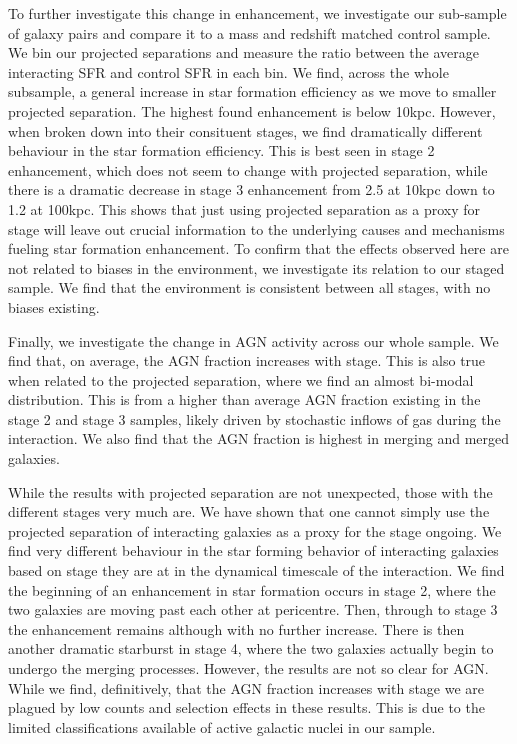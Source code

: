 To further investigate this change in enhancement, we investigate our sub-sample of galaxy pairs and compare it to a mass and redshift matched control sample. We bin our projected separations and measure the ratio between the average interacting SFR and control SFR in each bin. We find, across the whole subsample, a general increase in star formation efficiency as we move to smaller projected separation. The highest found enhancement is below 10kpc. However, when broken down into their consituent stages, we find dramatically different behaviour in the star formation efficiency. This is best seen in stage 2 enhancement, which does not seem to change with projected separation, while there is a dramatic decrease in stage 3 enhancement from 2.5 at 10kpc down to 1.2 at 100kpc. This shows that just using projected separation as a proxy for stage will leave out crucial information to the underlying causes and mechanisms fueling star formation enhancement. To confirm that the effects observed here are not related to biases in the environment, we investigate its relation to our staged sample. We find that the environment is consistent between all stages, with no biases existing.

Finally, we investigate the change in AGN activity across our whole sample. We find that, on average, the AGN fraction increases with stage. This is also true when related to the projected separation, where we find an almost bi-modal distribution. This is from a higher than average AGN fraction existing in the stage 2 and stage 3 samples, likely driven by stochastic inflows of gas during the interaction. We also find that the AGN fraction is highest in merging and merged galaxies.

While the results with projected separation are not unexpected, those with the different stages very much are. We have shown that one cannot simply use the projected separation of interacting galaxies as a proxy for the stage ongoing. We find very different behaviour in the star forming behavior of interacting galaxies based on stage they are at in the dynamical timescale of the interaction. We find the beginning of an enhancement in star formation occurs in stage 2, where the two galaxies are moving past each other at pericentre. Then, through to stage 3 the enhancement remains although with no further increase. There is then another dramatic starburst in stage 4, where the two galaxies actually begin to undergo the merging processes. However, the results are not so clear for AGN. While we find, definitively, that the AGN fraction increases with stage we are plagued by low counts and selection effects in these results. This is due to the limited classifications available of active galactic nuclei in our sample.

